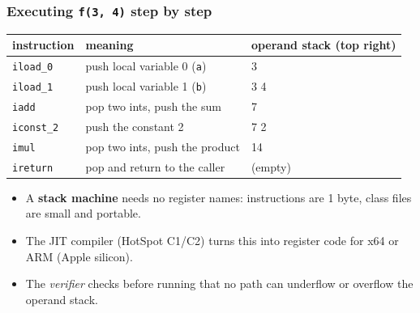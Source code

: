 \documentclass[aspectratio=169,10pt,compress]{beamer}
\begin{document}
\begin{frame}[t,fragile] \frametitle{Executing \texttt{f(3, 4)} step by step}
  \begin{center}\small
  \begin{tabular}{lll}
    \toprule
    \textbf{instruction} & \textbf{meaning}                         & \textbf{operand stack (top right)} \\
    \midrule
    \texttt{iload\_0}    & push local variable 0 (\texttt{a})       & 3 \\
    \texttt{iload\_1}    & push local variable 1 (\texttt{b})       & 3 4 \\
    \texttt{iadd}        & pop two ints, push the sum               & 7 \\
    \texttt{iconst\_2}   & push the constant 2                      & 7 2 \\
    \texttt{imul}        & pop two ints, push the product           & 14 \\
    \texttt{ireturn}     & pop and return to the caller             & (empty) \\
    \bottomrule
  \end{tabular}
  \end{center}
  \begin{itemize}\small
    \item A \textbf{stack machine} needs no register names: instructions are 1 byte, class files are small and portable.
    \item The JIT compiler (HotSpot C1/C2) turns this into register code for x64 or ARM (Apple silicon).
    \item The \emph{verifier} checks before running that no path can underflow or overflow the operand stack.
  \end{itemize}
\end{frame}

\end{document}
